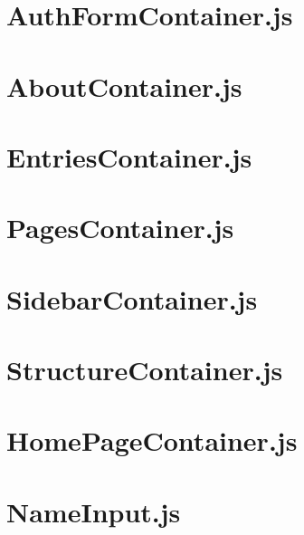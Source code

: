 \documentclass[a4paper,landscape]{report}
\begin{document}
\newpage
\section{AuthFormContainer.js}


\newpage
\section{AboutContainer.js}


\newpage
\section{EntriesContainer.js}


\newpage
\section{PagesContainer.js}


\newpage
\section{SidebarContainer.js}


\newpage
\section{StructureContainer.js}


\newpage
\section{HomePageContainer.js}


\newpage
\section{NameInput.js}

\end{document}
